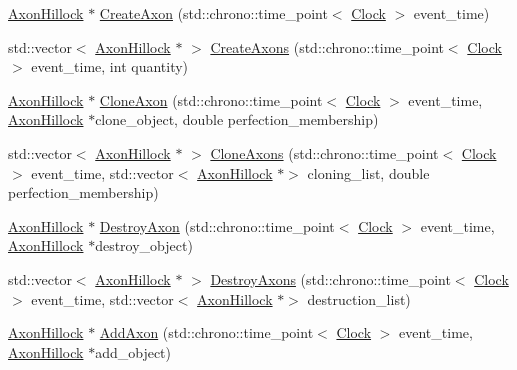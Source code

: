 \begin{DoxyCompactItemize}
\item 
\hyperlink{class_axon_hillock}{Axon\+Hillock} $\ast$ \hyperlink{class_axon_hillock_ae6b18ec6f2921b9d4461b89a9d72ab25}{Create\+Axon} (std\+::chrono\+::time\+\_\+point$<$ \hyperlink{universe_8h_a0ef8d951d1ca5ab3cfaf7ab4c7a6fd80}{Clock} $>$ event\+\_\+time)
\item 
std\+::vector$<$ \hyperlink{class_axon_hillock}{Axon\+Hillock} $\ast$ $>$ \hyperlink{class_axon_hillock_a15bf1a433f38b8b0c92e4a4efe22ec6f}{Create\+Axons} (std\+::chrono\+::time\+\_\+point$<$ \hyperlink{universe_8h_a0ef8d951d1ca5ab3cfaf7ab4c7a6fd80}{Clock} $>$ event\+\_\+time, int quantity)
\item 
\hyperlink{class_axon_hillock}{Axon\+Hillock} $\ast$ \hyperlink{class_axon_hillock_ad54833cee03cfcacb5e88d174048aaa4}{Clone\+Axon} (std\+::chrono\+::time\+\_\+point$<$ \hyperlink{universe_8h_a0ef8d951d1ca5ab3cfaf7ab4c7a6fd80}{Clock} $>$ event\+\_\+time, \hyperlink{class_axon_hillock}{Axon\+Hillock} $\ast$clone\+\_\+object, double perfection\+\_\+membership)
\item 
std\+::vector$<$ \hyperlink{class_axon_hillock}{Axon\+Hillock} $\ast$ $>$ \hyperlink{class_axon_hillock_aa65cead56b10bda66dc256c68764a553}{Clone\+Axons} (std\+::chrono\+::time\+\_\+point$<$ \hyperlink{universe_8h_a0ef8d951d1ca5ab3cfaf7ab4c7a6fd80}{Clock} $>$ event\+\_\+time, std\+::vector$<$ \hyperlink{class_axon_hillock}{Axon\+Hillock} $\ast$$>$ cloning\+\_\+list, double perfection\+\_\+membership)
\item 
\hyperlink{class_axon_hillock}{Axon\+Hillock} $\ast$ \hyperlink{class_axon_hillock_a031b2cc7292d023506a5124639a941a7}{Destroy\+Axon} (std\+::chrono\+::time\+\_\+point$<$ \hyperlink{universe_8h_a0ef8d951d1ca5ab3cfaf7ab4c7a6fd80}{Clock} $>$ event\+\_\+time, \hyperlink{class_axon_hillock}{Axon\+Hillock} $\ast$destroy\+\_\+object)
\item 
std\+::vector$<$ \hyperlink{class_axon_hillock}{Axon\+Hillock} $\ast$ $>$ \hyperlink{class_axon_hillock_a083c918c64c60f3cea1d39aa8e0c6fba}{Destroy\+Axons} (std\+::chrono\+::time\+\_\+point$<$ \hyperlink{universe_8h_a0ef8d951d1ca5ab3cfaf7ab4c7a6fd80}{Clock} $>$ event\+\_\+time, std\+::vector$<$ \hyperlink{class_axon_hillock}{Axon\+Hillock} $\ast$$>$ destruction\+\_\+list)
\item 
\hyperlink{class_axon_hillock}{Axon\+Hillock} $\ast$ \hyperlink{class_axon_hillock_a02bfbaea9ea7a160933f8500c8b41d6a}{Add\+Axon} (std\+::chrono\+::time\+\_\+point$<$ \hyperlink{universe_8h_a0ef8d951d1ca5ab3cfaf7ab4c7a6fd80}{Clock} $>$ event\+\_\+time, \hyperlink{class_axon_hillock}{Axon\+Hillock} $\ast$add\+\_\+object)

\end{DoxyCompactItemize}
